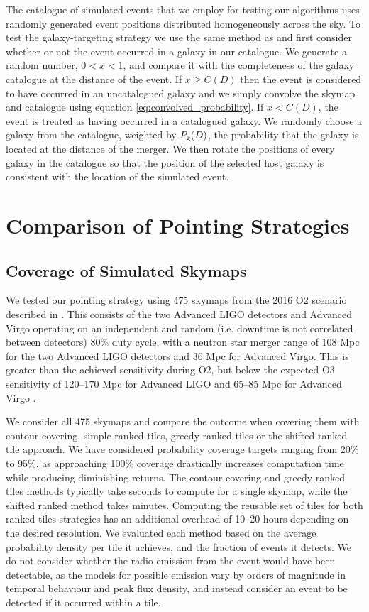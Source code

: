 The catalogue of simulated events that we employ for testing our algorithms uses randomly generated event positions distributed homogeneously across the sky. To test the galaxy-targeting strategy we use the same method as \citet{2016MNRAS.462.1591E} and first consider whether or not the event occurred in a galaxy in our catalogue. We generate a random number, $0<x<1$, and compare it with the completeness of the galaxy catalogue at the distance of the event. If $x\geq C(D)$ then the event is considered to have occurred in an uncatalogued galaxy and we simply convolve the skymap and catalogue using equation \ref{eq:convolved_probability}. If $x<C(D)$, the event is treated as having occurred in a catalogued galaxy. We randomly choose a galaxy from the catalogue, weighted by $P_{\rm g}(D)$, the probability that the galaxy is located at the distance of the merger. We then rotate the positions of every galaxy in the catalogue so that the position of the selected host galaxy is consistent with the location of the simulated event.



\pagebreak
\section{Comparison of Pointing Strategies}
\subsection{Coverage of Simulated Skymaps}
We tested our pointing strategy using 475 skymaps from the 2016 O2 scenario described in \citet{2014ApJ...795..105S}. This consists of the two Advanced LIGO detectors and Advanced Virgo operating on an independent and random (i.e. downtime is not correlated between detectors) 80\% duty cycle, with a neutron star merger range of 108 Mpc for the two Advanced LIGO detectors and 36 Mpc for Advanced Virgo. This is greater than the achieved sensitivity during O2, but below the expected O3 sensitivity of 120--170 Mpc for Advanced LIGO and 65--85 Mpc for Advanced Virgo \citep{2018LRR....21....3A}.

We consider all 475 skymaps and compare the outcome when covering them with contour-covering, simple ranked tiles, greedy ranked tiles or the shifted ranked tile approach. We have considered probability coverage targets ranging from 20\% to 95\%, as approaching 100\% coverage drastically increases computation time while producing diminishing returns. The contour-covering and greedy ranked tiles methods typically take seconds to compute for a single skymap, while the shifted ranked method takes minutes. Computing the reusable set of tiles for both ranked tiles strategies has an additional overhead of 10--20 hours depending on the desired resolution. We evaluated each method based on the average probability density per tile it achieves, and the fraction of events it detects. We do not consider whether the radio emission from the event would have been detectable, as the models for possible emission vary by orders of magnitude in temporal behaviour and peak flux density, and instead consider an event to be detected if it occurred within a tile.

